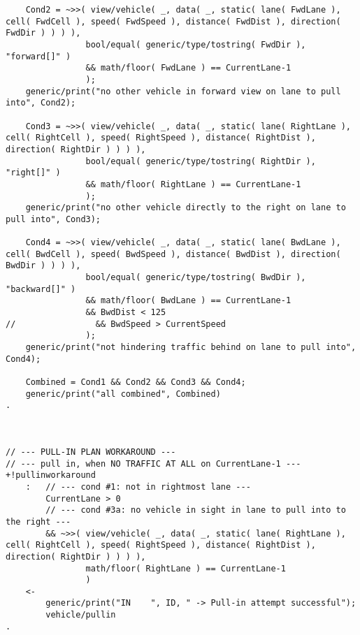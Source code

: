\begin{lstlisting}
    Cond2 = ~>>( view/vehicle( _, data( _, static( lane( FwdLane ), cell( FwdCell ), speed( FwdSpeed ), distance( FwdDist ), direction( FwdDir ) ) ) ),
                bool/equal( generic/type/tostring( FwdDir ), "forward[]" ) 
                && math/floor( FwdLane ) == CurrentLane-1
                );
    generic/print("no other vehicle in forward view on lane to pull into", Cond2);

    Cond3 = ~>>( view/vehicle( _, data( _, static( lane( RightLane ), cell( RightCell ), speed( RightSpeed ), distance( RightDist ), direction( RightDir ) ) ) ),
                bool/equal( generic/type/tostring( RightDir ), "right[]" ) 
                && math/floor( RightLane ) == CurrentLane-1
                );
    generic/print("no other vehicle directly to the right on lane to pull into", Cond3);

    Cond4 = ~>>( view/vehicle( _, data( _, static( lane( BwdLane ), cell( BwdCell ), speed( BwdSpeed ), distance( BwdDist ), direction( BwdDir ) ) ) ),
                bool/equal( generic/type/tostring( BwdDir ), "backward[]" ) 
                && math/floor( BwdLane ) == CurrentLane-1
                && BwdDist < 125
//                && BwdSpeed > CurrentSpeed 
                );
    generic/print("not hindering traffic behind on lane to pull into", Cond4);

    Combined = Cond1 && Cond2 && Cond3 && Cond4;
    generic/print("all combined", Combined)
.



// --- PULL-IN PLAN WORKAROUND ---
// --- pull in, when NO TRAFFIC AT ALL on CurrentLane-1 --- 
+!pullinworkaround
    :   // --- cond #1: not in rightmost lane ---
        CurrentLane > 0
        // --- cond #3a: no vehicle in sight in lane to pull into to the right ---
        && ~>>( view/vehicle( _, data( _, static( lane( RightLane ), cell( RightCell ), speed( RightSpeed ), distance( RightDist ), direction( RightDir ) ) ) ),
                math/floor( RightLane ) == CurrentLane-1 
                )
    <-
        generic/print("IN    ", ID, " -> Pull-in attempt successful");
        vehicle/pullin
.




\end{lstlisting}
